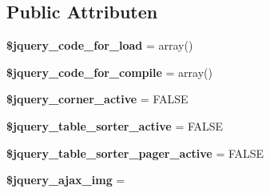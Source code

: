 \subsection*{Public Attributen}
\begin{DoxyCompactItemize}
\item 
\mbox{\label{class_c_i___jquery_aae273040292e1e032140a014d38f6f0c}} 
{\bfseries \$jquery\+\_\+code\+\_\+for\+\_\+load} = array()
\item 
\mbox{\label{class_c_i___jquery_a807e6910954f1e8e354f7eb16332af3c}} 
{\bfseries \$jquery\+\_\+code\+\_\+for\+\_\+compile} = array()
\item 
\mbox{\label{class_c_i___jquery_a86584cd6fadb4fe08bc8cf65d98da4f3}} 
{\bfseries \$jquery\+\_\+corner\+\_\+active} = F\+A\+L\+SE
\item 
\mbox{\label{class_c_i___jquery_a29e31c754cf116ca8fb50756b582f3a9}} 
{\bfseries \$jquery\+\_\+table\+\_\+sorter\+\_\+active} = F\+A\+L\+SE
\item 
\mbox{\label{class_c_i___jquery_a43cc145aba3c11e907fb4245f23bc44e}} 
{\bfseries \$jquery\+\_\+table\+\_\+sorter\+\_\+pager\+\_\+active} = F\+A\+L\+SE
\item 
\mbox{\label{class_c_i___jquery_a41fe5a2b111f2b05a95712824ad1e7f4}} 
{\bfseries \$jquery\+\_\+ajax\+\_\+img} = \textquotesingle{}\textquotesingle{}
\end{DoxyCompactItemize}
